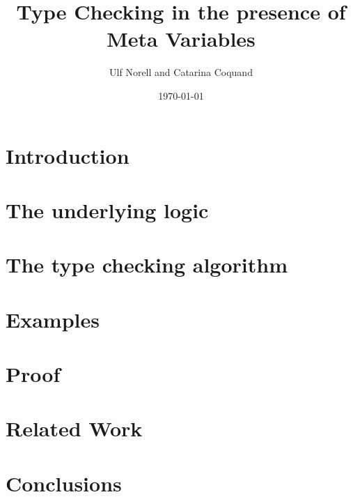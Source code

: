 \documentclass[11pt]{llncs}
\title{Type Checking in the presence of Meta Variables}
\author{Ulf Norell and Catarina Coquand}
\institute{Chalmers University of Technology}
\date{\today}
\begin{document}
\maketitle



\section{Introduction} 

\section{The underlying logic \Core} 

\section{The type checking algorithm} \label{secRules} 

\section{Examples} 

\section{Proof} \label{secProof} 

\section{Related Work} 

\section{Conclusions} 



\end{document}
